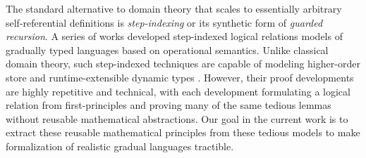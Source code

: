 The standard alternative to domain theory that scales to essentially
arbitrary self-referential definitions is \emph{step-indexing} or its
synthetic form of \emph{guarded recursion}.
A series of works \cite{new-ahmed2018, new-licata-ahmed2019, new-jamner-ahmed19}
developed step-indexed logical relations models of gradually typed
languages based on operational semantics. Unlike classical domain
theory, such step-indexed techniques are capable of modeling
higher-order store and runtime-extensible dynamic types
\cite{amalsthesis,nonpmetricparamorsomething,new-jamner-ahmed19}. However,
their proof developments are highly repetitive and technical, with
each development formulating a logical relation from first-principles
and proving many of the same tedious lemmas without reusable
mathematical abstractions. Our goal in the current work is to extract
these reusable mathematical principles from these tedious models to
make formalization of realistic gradual languages tractible.







